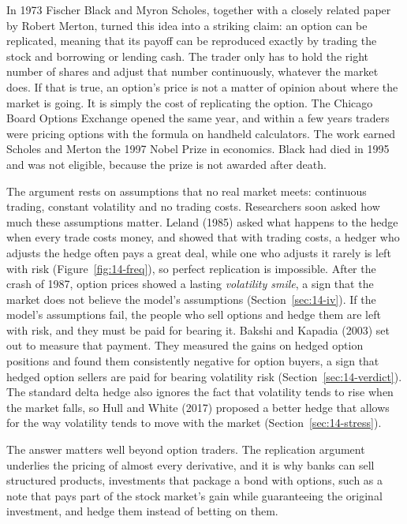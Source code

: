 In 1973 Fischer Black and Myron Scholes, together with a closely related paper by Robert Merton, turned this idea into a striking claim: an option can be replicated, meaning that its payoff can be reproduced exactly by trading the stock and borrowing or lending cash. The trader only has to hold the right number of shares and adjust that number continuously, whatever the market does. If that is true, an option's price is not a matter of opinion about where the market is going. It is simply the cost of replicating the option. The Chicago Board Options Exchange opened the same year, and within a few years traders were pricing options with the formula on handheld calculators. The work earned Scholes and Merton the 1997 Nobel Prize in economics. Black had died in 1995 and was not eligible, because the prize is not awarded after death.


The argument rests on assumptions that no real market meets: continuous trading, constant volatility and no trading costs. Researchers soon asked how much these assumptions matter. Leland (1985) asked what happens to the hedge when every trade costs money, and showed that with trading costs, a hedger who adjusts the hedge often pays a great deal, while one who adjusts it rarely is left with risk (Figure~\ref{fig:14-freq}), so perfect replication is impossible. After the crash of 1987, option prices showed a lasting \emph{volatility smile}, a sign that the market does not believe the model's assumptions (Section~\ref{sec:14-iv}). If the model's assumptions fail, the people who sell options and hedge them are left with risk, and they must be paid for bearing it. Bakshi and Kapadia (2003) set out to measure that payment. They measured the gains on hedged option positions and found them consistently negative for option buyers, a sign that hedged option sellers are paid for bearing volatility risk (Section~\ref{sec:14-verdict}). The standard delta hedge also ignores the fact that volatility tends to rise when the market falls, so Hull and White (2017) proposed a better hedge that allows for the way volatility tends to move with the market (Section~\ref{sec:14-stress}).



The answer matters well beyond option traders. The replication argument underlies the pricing of almost every derivative, and it is why banks can sell structured products, investments that package a bond with options, such as a note that pays part of the stock market's gain while guaranteeing the original investment, and hedge them instead of betting on them. 

